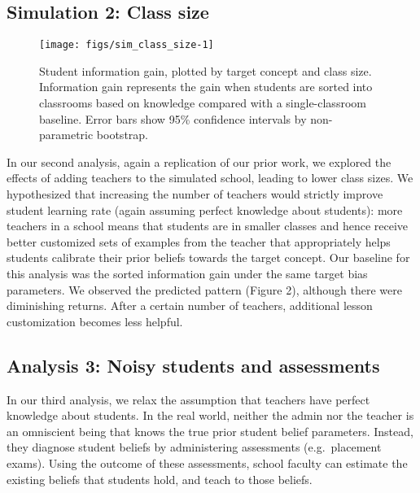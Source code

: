 \documentclass[10pt, letterpaper]{article}
\newenvironment{CodeChunk}{}{}
\begin{document}
\subsection{Simulation 2: Class size}\label{simulation-2-class-size}

\begin{CodeChunk}
\begin{figure}[t]
\texttt{[image: figs/sim\_class\_size-1]} \caption[Student information gain, plotted by target concept and class size]{Student information gain, plotted by target concept and class size. Information gain represents the gain when students are sorted into classrooms based on knowledge compared with a single-classroom baseline. Error bars show 95\% confidence intervals by non-parametric bootstrap.}\label{fig:sim_class_size}
\end{figure}
\end{CodeChunk}

In our second analysis, again a replication of our prior work, we
explored the effects of adding teachers to the simulated school, leading
to lower class sizes. We hypothesized that increasing the number of
teachers would strictly improve student learning rate (again assuming
perfect knowledge about students): more teachers in a school means that
students are in smaller classes and hence receive better customized sets
of examples from the teacher that appropriately helps students calibrate
their prior beliefs towards the target concept. Our baseline for this
analysis was the sorted information gain under the same target bias
parameters. We observed the predicted pattern (Figure 2), although there
were diminishing returns. After a certain number of teachers, additional
lesson customization becomes less helpful.

\subsection{Analysis 3: Noisy students and
assessments}\label{analysis-3-noisy-students-and-assessments}

In our third analysis, we relax the assumption that teachers have
perfect knowledge about students. In the real world, neither the admin
nor the teacher is an omniscient being that knows the true prior student
belief parameters. Instead, they diagnose student beliefs by
administering assessments (e.g.~placement exams). Using the outcome of
these assessments, school faculty can estimate the existing beliefs that
students hold, and teach to those beliefs.
\end{document}
